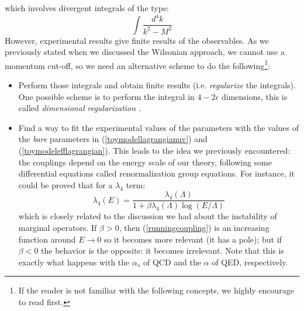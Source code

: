 \documentclass[11pt]{article}
\begin{document}
\noindent which involves divergent integrals of the type:
\begin{equation}
    \int \dfrac{d^4k}{k^2-M^2}
\end{equation}
However, experimental results give finite results of the observables. As we previously stated when we discussed the Wilsonian approach, we cannot use a momentum cut-off, so we need an alternative scheme to do the following\footnote{If the reader is not familiar with the following concepts, we highly encourage to read \cite{Olness_2011} first.}:
\begin{itemize}
    \item Perform those integrals and obtain finite results (i.e. \textit{regularize} the integrals). One possible scheme is to perform the integral in $4-2\epsilon$ dimensions, this is called \textit{dimensional regularization} \cite{Peskin:1995ev}.
    \item Find a way to fit the experimental values of the parameters with the values of the \textit{bare} parameters in (\ref{toymodellagrangianuv}) and (\ref{toymodelefflagrangian}). This leads to the idea we previously encountered: the couplings depend on the energy scale of our theory, following some differential equations called renormalization group equations. For instance, it could be proved that for a $\lambda_4$ term:
    \begin{equation}\label{runningcoupling}
        \lambda_4(E)=\dfrac{\lambda_4(\Lambda)}{1+\beta\lambda_4(\Lambda)\log(E/\Lambda)}
    \end{equation}
    which is closely related to the discussion we had about the instability of marginal operators. If $\beta>0$, then (\ref{runningcoupling}) is an increasing function around $E\to0$ so it becomes more relevant (it has a pole); but if $\beta<0$ the behavior is the opposite: it becomes irrelevant. Note that this is exactly what happens with the $\alpha_s$ of QCD and the $\alpha$ of QED, respectively.
\end{itemize}
\end{document}
